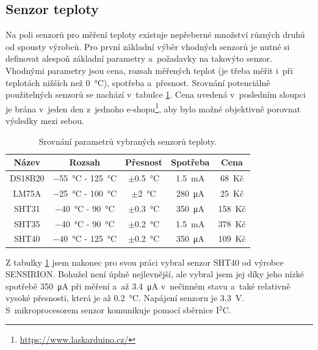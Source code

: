\subsection{Senzor teploty}

Na poli senzorů pro měření teploty existuje nepřeberné množství různých druhů od spousty výrobců. Pro první základní výběr vhodných senzorů je nutné si definovat alespoň základní parametry a~požadavky na takovýto senzor. Vhodnými parametry jsou cena, rozsah měřených teplot (je třeba měřit i~při teplotách nižších než \SI{0}{\celsius}), spotřeba a~přesnost. Srovnání potenciálně použitelných senzorů se nachází v~tabulce \ref{tab_TemperatureSensors}. Cena uvedená v~posledním sloupci je brána v~jeden den z~jednoho e-shopu\footnote{\url{https://www.laskarduino.cz/}}, aby bylo možné objektivně porovnat výsledky mezi sebou.

\begin{table}[]
    \centering
    \begin{tabular}{c|cccc}
    \textbf{Název} & \textbf{Rozsah}                         & \textbf{Přesnost}       & \textbf{Spotřeba}       & \textbf{Cena} \\ \hline
    DS18B20        & \SI{-55}{\celsius} - \SI{125}{\celsius} & $\pm$\SI{0,5}{\celsius} & \SI{1,5}{\milli\ampere} & 68~Kč         \\
    LM75A          & \SI{-25}{\celsius} - \SI{100}{\celsius} & $\pm$\SI{2}{\celsius}   & \SI{280}{\micro\ampere} & 25~Kč         \\
    SHT31          & \SI{-40}{\celsius} - \SI{90}{\celsius}  & $\pm$\SI{0,3}{\celsius} & \SI{350}{\micro\ampere} & 158~Kč        \\
    SHT35          & \SI{-40}{\celsius} - \SI{90}{\celsius}  & $\pm$\SI{0,2}{\celsius} & \SI{1,5}{\milli\ampere} & 378~Kč        \\
    SHT40          & \SI{-40}{\celsius} - \SI{125}{\celsius} & $\pm$\SI{0,2}{\celsius} & \SI{350}{\micro\ampere} & 109~Kč             
    \end{tabular}
    \caption{Srovnání parametrů vybraných senzorů teploty.}
    \label{tab_TemperatureSensors}
\end{table}

Z tabulky \ref{tab_TemperatureSensors} jsem nakonec pro svou práci vybral senzor SHT40 od výrobce SENSIRION. Bohužel není úplně nejlevnější, ale vybral jsem jej díky jeho nízké spotřebě \SI{350}{\micro\ampere} při měření a~až \SI{3,4}{\micro\ampere} v~nečinném stavu a~také relativně vysoké přesnosti, která je až \SI{0,2}{\celsius}. Napájení senzoru je \SI{3,3}{\volt}. S~mikroprocesorem senzor komunikuje pomocí sběrnice I$^2$C. 


